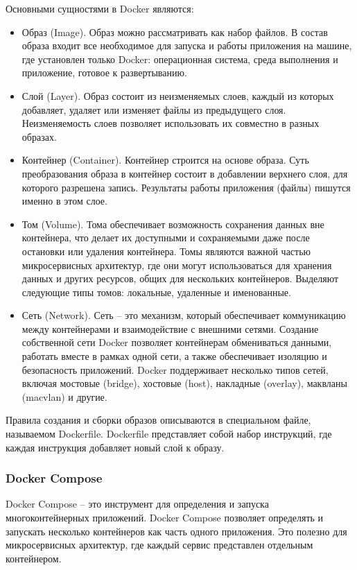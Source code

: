Основными сущностями в Docker являются:
\begin{itemize}
    \item Образ (Image).
    Образ можно рассматривать как набор файлов.
    В состав образа входит все необходимое для запуска и работы приложения на машине, где установлен только Docker: операционная система, среда выполнения и приложение, готовое к развертыванию.
    \item Слой (Layer).
    Образ состоит из неизменяемых слоев, каждый из которых добавляет, удаляет или изменяет файлы из предыдущего слоя.
    Неизменяемость слоев позволяет использовать их совместно в разных образах.
    \item Контейнер (Container).
    Контейнер строится на основе образа.
    Суть преобразования образа в контейнер состоит в добавлении верхнего слоя, для которого разрешена запись.
    Результаты работы приложения (файлы) пишутся именно в этом слое.
    \item Том (Volume).
    Тома обеспечивает возможность сохранения данных вне контейнера, что делает их доступными и сохраняемыми даже после остановки или удаления контейнера.
    Томы являются важной частью микросервисных архитектур, где они могут использоваться для хранения данных и других ресурсов, общих для нескольких контейнеров.
    Выделяют следующие типы томов: локальные, удаленные и именованные.
    \item Сеть (Network).
    Сеть -- это механизм, который обеспечивает коммуникацию между контейнерами и взаимодействие с внешними сетями.
    Создание собственной сети Docker позволяет контейнерам обмениваться данными, работать вместе в рамках одной сети, а также обеспечивает изоляцию и безопасность приложений.
    Docker поддерживает несколько типов сетей, включая мостовые (bridge), хостовые (host), накладные (overlay), маквланы (macvlan) и другие.
\end{itemize}

Правила создания и сборки образов описываются в специальном файле, называемом Dockerfile.
Dockerfile представляет собой набор инструкций, где каждая инструкция добавляет новый слой к образу.

\subsubsection{Docker Compose}\label{subsubsec:domain:docker-compose}
Docker Compose -- это инструмент для определения и запуска многоконтейнерных приложений.
Docker Compose позволяет определять и запускать несколько контейнеров как часть одного приложения.
Это полезно для микросервисных архитектур, где каждый сервис представлен отдельным контейнером.

